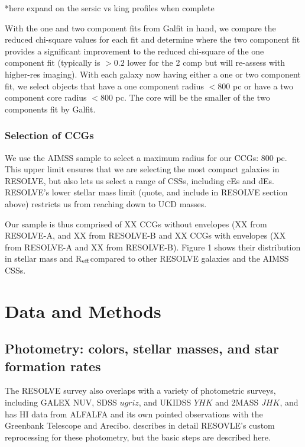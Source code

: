 \documentclass[iop,apj,twocolappendix]{emulateapj}
\newcommand{\Reff}{R$_{\rm eff}$}
\begin{document}
*here expand on the sersic vs king profiles when complete

With the one and two component fits from Galfit in hand, we compare the reduced chi-square values for each fit and determine where the two component fit provides a significant improvement to the reduced chi-square of the one component fit (typically is $>0.2$ lower for the 2 comp but will re-assess with higher-res imaging). With each galaxy now having either a one or two component fit, we select objects that have a one component radius $<800$ pc  or have a two component core radius $<800$ pc. The core will be the smaller of the two components fit by Galfit. 

\subsubsection{Selection of CCGs}
\label{ccgsel}

\noindent We use the AIMSS sample to select a maximum radius for our CCGs: 800 pc. This upper limit ensures that we are selecting the most compact galaxies in RESOLVE, but also lets us select a range of CSSs, including cEs and dEs. RESOLVE's lower stellar mass limit (quote, and include in RESOLVE section above) restricts us from reaching down to UCD masses.

Our sample is thus comprised of XX CCGs without envelopes (XX from RESOLVE-A, and XX from RESOLVE-B and XX CCGs with envelopes (XX from RESOLVE-A and XX from RESOLVE-B). Figure 1 shows their distribution in stellar mass and \Reff compared to other RESOLVE galaxies and the AIMSS CSSs. 



\section{Data and Methods}
\label{methods}

\subsection{Photometry: colors, stellar masses, and star formation rates}
\label{phot}
\noindent The RESOLVE survey also overlaps with a variety of photometric surveys, including GALEX NUV, SDSS $ugriz$, and UKIDSS $YHK$ and 2MASS $JHK$, and has HI data from ALFALFA and its own pointed observations with the Greenbank Telescope and Arecibo. \cite{Eckert2015} describes in detail RESOVLE's custom reprocessing for these photometry, but the basic steps are described here.
\end{document}
